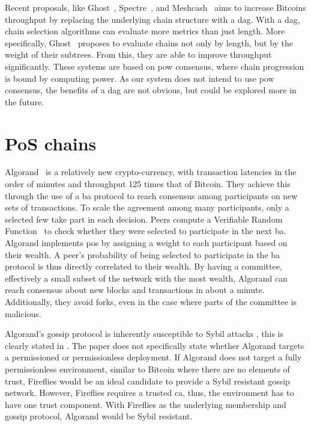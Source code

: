 \documentclass[USenglish]{uit-thesis}
\begin{document}
Recent proposals, like Ghost~\cite{ghost, ghost2}, Spectre~\cite{spec}, and Meshcash~\cite{tort} aims to increase Bitcoins throughput by replacing the underlying chain structure with a \gls{dag}.
With a \gls{dag}, chain selection algorithms can evaluate more metrics than just length.
More specifically, Ghost~\cite{ghost} proposes to evaluate chains not only by length, but by the weight of their subtrees.
From this, they are able to improve throughput significantly.
These systems are based on \gls{pow} consensus, where chain progression is bound by computing power.
As our system does not intend to use \gls{pow} consensus, the benefits of a \gls{dag} are not obvious, but could be explored more in the future.


\section{PoS chains}
Algorand~\cite{algorand, algorand2} is a relatively new crypto-currency, with transaction latencies in the order of minutes and throughput 125 times that of Bitcoin.
They achieve this through the use of a \gls{ba} protocol to reach consensus among participants on new sets of transactions.
To scale the agreement among many participants, only a selected few take part in each decision.
Peers compute a Verifiable Random Function~\cite{verirandom} to check whether they were selected to participate in the next \gls{ba}.
Algorand implements \gls{pos} by assigning a weight to each participant based on their wealth.
A peer's probability of being selected to participate in the \gls{ba} protocol is thus directly correlated to their wealth.  
By having a committee, effectively a small subset of the network with the most wealth, Algorand can reach consensus about new blocks and transactions in about a minute. 
Additionally, they avoid forks, even in the case where parts of the committee is malicious.

Algorand's gossip protocol is inherently susceptible to Sybil attacks \cite{sybil}, this is clearly stated in \cite{algorand}.
The paper does not specifically state whether Algorand targets a permissioned or permissionless deployment.
If Algorand does not target a fully permissionless environment, similar to Bitcoin \cite{bitcoin} where there are no elements of trust, Fireflies \cite{flies} would be an ideal candidate to provide a Sybil resistant gossip network.
However, Fireflies requires a trusted \gls{ca}, thus, the environment has to have one trust component.
With Fireflies as the underlying membership and gossip protocol, Algorand would be Sybil resistant.
\end{document}
